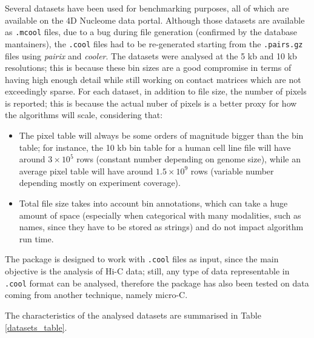 Several datasets have been used for benchmarking purposes, all of which are available on the 4D Nucleome data portal\cite{4dn2022}. Although those datasets are available as \texttt{.mcool} files, due to a bug during file generation (confirmed by the database mantainers), the \texttt{.cool} files had to be re-generated starting from the \texttt{.pairs.gz} files using \emph{pairix}\cite{pairix2022} and
\emph{cooler}. The datasets were analysed at the 5 kb and 10 kb resolutions; this is because these bin sizes are a good compromise in terms of having high enough detail while still working on contact matrices which are not exceedingly sparse. For each dataset, in addition to file size, the number of pixels is reported; this is because the actual nuber of pixels is a better proxy for how the algorithms will scale, considering that: 
\begin{itemize}\tightlist
  \item The pixel table will always be some orders of magnitude bigger than the bin table; for instance, the 10 kb bin table for a human cell line file will have around $3 \times 10^5$ rows (constant number depending on genome size), while an average pixel table will have around $1.5 \times 10^9$ rows (variable number depending mostly on experiment coverage).
  \item Total file size takes into account bin annotations, which can take a huge amount of space (especially when categorical with many modalities, such as names, since they have to be stored as strings) and do not impact algorithm run time.
\end{itemize}

The package is designed to work with \texttt{.cool} files as input, since the main objective is the analysis of Hi-C data; still, any type of data representable in \texttt{.cool} format can be analysed, therefore the package has also been tested on data coming from another technique, namely micro-C.

The characteristics of the analysed datasets are summarised in Table \ref{datasets_table}.

